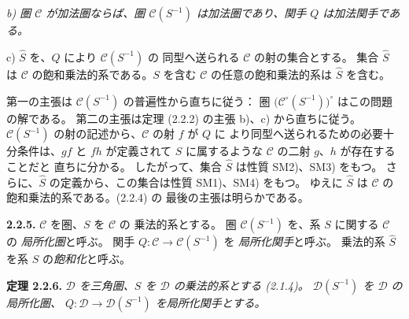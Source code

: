 \clearpage
{}%
\begingroup
\small
\setlength{\emergencystretch}{2em}%
\setlength{\parskip}{0pt}%
\setlength{\abovedisplayskip}{1pt plus 1pt minus 1pt}%
\setlength{\belowdisplayskip}{1pt plus 1pt minus 1pt}%

\begingroup\itshape
{}
\noindent b) 圏 $\mathcal C$ が加法圏ならば、圏
$\mathcal C(S^{-1})$ は加法圏であり、関手 $Q$ は加法関手である。

\par\noindent c) $\widehat S$ を、$Q$ により $\mathcal C(S^{-1})$ の
同型へ送られる $\mathcal C$ の射の集合とする。
%
集合 $\widehat S$ は $\mathcal C$ の飽和乗法的系である。$S$ を含む
$\mathcal C$ の任意の飽和乗法的系は $\widehat S$ を含む。
\endgroup

\par\noindent 第一の主張は $\mathcal C(S^{-1})$ の普遍性から直ちに従う：
圏 $\bigl(\mathcal C^\circ(S^{-1})\bigr)^\circ$ はこの問題の解である。
第二の主張は定理 (2.2.2) の主張 b)、c) から直ちに従う。
%
$\mathcal C(S^{-1})$ の射の記述から、$\mathcal C$ の射 $f$ が $Q$ に
より同型へ送られるための必要十分条件は、$gf$ と $fh$ が定義されて
$S$ に属するような $\mathcal C$ の二射 $g$、$h$ が存在することだと
直ちに分かる。
%
したがって、集合 $\widehat S$ は性質 SM2)、SM3) をもつ。
%
さらに、$\widehat S$ の定義から、この集合は性質 SM1)、SM4) をもつ。
%
ゆえに $\widehat S$ は $\mathcal C$ の飽和乗法的系である。(2.2.4) の
最後の主張は明らかである。

\smallskip
\noindent\textbf{2.2.5.} $\mathcal C$ を圏、$S$ を $\mathcal C$ の
乗法的系とする。
%
圏 $\mathcal C(S^{-1})$ を、系 $S$ に関する $\mathcal C$ の
\emph{局所化圏}と呼ぶ。
%
関手 $Q\colon\mathcal C\longrightarrow\mathcal C(S^{-1})$ を
\emph{局所化関手}と呼ぶ。
%
乗法的系 $\widehat S$ を系 $S$ の\emph{飽和化}と呼ぶ。

\smallskip
\noindent\textbf{定理 2.2.6.}\quad
\begingroup\itshape
{}%
$\mathcal D$ を三角圏、$S$ を $\mathcal D$ の乗法的系とする (2.1.4)。
$\mathcal D(S^{-1})$ を $\mathcal D$ の局所化圏、
$Q\colon\mathcal D\longrightarrow\mathcal D(S^{-1})$ を局所化関手とする。


